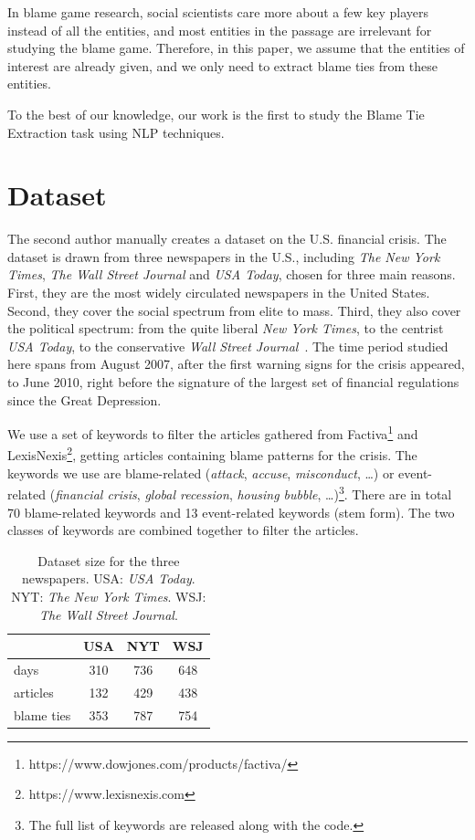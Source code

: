 \documentclass[letterpaper]{article} %
\begin{document}
In blame game research, social scientists care more about a few key players instead of all the entities, and most entities in the passage are irrelevant for studying the blame game. Therefore, in this paper, we assume that the entities of interest are already given, and we only need to extract blame ties from these entities.

To the best of our knowledge, our work is the first to study the Blame Tie Extraction task using NLP techniques.

\section{Dataset}
\label{dataset}
The second author manually creates a dataset on the U.S. financial crisis. The dataset is drawn from three newspapers in the U.S., including {\it The New York Times}, {\it The Wall Street Journal} and {\it USA Today}, chosen for three main reasons. First, they are the most widely circulated newspapers in the United States. Second, they cover the social spectrum from elite to mass. Third, they also cover the political spectrum: from the quite liberal {\it New York Times}, to the centrist {\it USA Today}, to the conservative {\it Wall Street Journal}~\cite{gentzkow2010drives,groseclose2005measure}. The time period studied here spans from August 2007, after the first warning signs for the crisis appeared, to June 2010, right before the signature of the largest set of financial regulations since the Great Depression.

We use a set of keywords to filter the articles gathered from Factiva\footnote{https://www.dowjones.com/products/factiva/} and LexisNexis\footnote{https://www.lexisnexis.com}, getting articles containing blame patterns for the crisis. The keywords we use are blame-related ({\it attack}, {\it accuse}, {\it misconduct}, \ldots) or event-related ({\it financial crisis}, {\it global recession}, {\it housing bubble}, \ldots)\footnote{The full list of keywords are released along with the code.}. There are in total 70 blame-related keywords and 13 event-related keywords (stem form). The two classes of keywords are combined together to filter the articles.

\begin{table}[t!]
\centering
\begin{tabular}{l c c c} 
 \hline
 & {\bf USA} &  {\bf NYT}  & {\bf WSJ} \\ 
 \hline\hline
 days & 310 & 736 & 648 \\ 
 articles & 132 & 429 & 438 \\
 blame ties & 353 & 787 & 754 \\
 \hline
\end{tabular}
\caption{Dataset size for the three newspapers. USA: {\it USA Today}. NYT: {\it The New York Times}. WSJ: {\it The Wall Street Journal}.}
\label{table:dataset}
\end{table}
\end{document}

